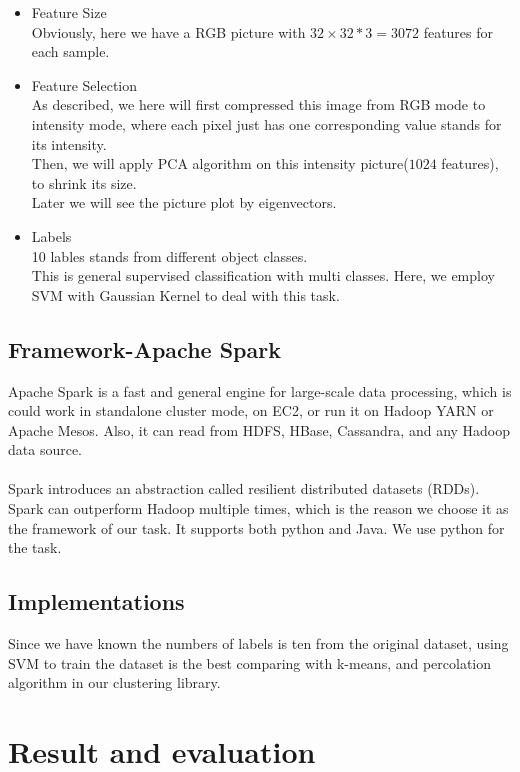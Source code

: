 \documentclass[a4paper]{article}
\begin{document}
\begin{itemize}
\item Feature Size\\
Obviously, here we have a RGB picture with $32 \times 32 *3 = 3072$ features for each sample.
\item Feature Selection\\
As described, we here will first compressed this image from RGB mode to intensity mode, where each pixel just has one corresponding value stands for its intensity.\\
Then, we will apply PCA algorithm on this intensity picture($1024$ features), to shrink its size.\\
Later we will see the picture plot by eigenvectors.
\item Labels\\
10 lables stands from different object classes.\\
This is general supervised classification with multi classes. Here, we employ SVM with Gaussian Kernel to deal with this task.

\end{itemize}

\subsection{Framework-Apache Spark}
Apache Spark is a fast and general engine for large-scale data processing, which is could work in standalone cluster mode, on EC2, or run it on Hadoop YARN or Apache Mesos. Also, it can read from HDFS, HBase, Cassandra, and any Hadoop data source.\\
\\
Spark introduces an abstraction called resilient distributed datasets (RDDs). Spark can outperform Hadoop multiple times, which is the reason we choose it as the framework of our task. It supports both python and Java. We use python for the task. 


\subsection{Implementations}

Since we have known the numbers of labels is ten from the original dataset, using SVM to train the dataset is the best comparing with k-means, and percolation algorithm in our clustering library. 


\section{Result and evaluation}
\end{document}
